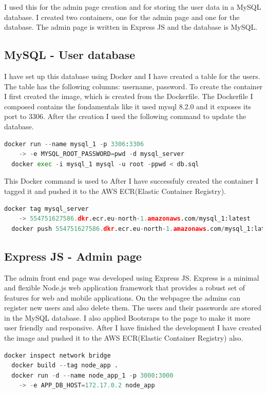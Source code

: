 \documentclass[11pt,a4paper,oneside]{report}
\begin{document}
I used this for the admin page creation and for storing the user data in a MySQL database. I created two containers, one for the admin page and one for the database. The admin page is written in Express JS and the database is MySQL.

\subsection{MySQL - User database}
I have set up this database using Docker and I have created a table for the users. The table has the following columns: username, password. To create the container I first created the image, which is created from the Dockerfile. The Dockerfile I composed contains the fondamentals like it used mysql 8.2.0 and it exposes its port to 3306.
After the creation I used the following command to update the database.
\begin{lstlisting}[language=Python,basicstyle=\ttfamily\small,]
  docker run --name mysql_1 -p 3306:3306 
    -> -e MYSQL_ROOT_PASSWORD=pwd -d mysql_server
  docker exec -i mysql_1 mysql -u root -ppwd < db.sql
\end{lstlisting}
This Docker command is used to
After I have successfuly created the container I tagged it and pushed it to the AWS ECR(Elastic Container Registry).

\begin{lstlisting}[language=Python,basicstyle=\ttfamily\small,]
  docker tag mysql_server 
    -> 554751627586.dkr.ecr.eu-north-1.amazonaws.com/mysql_1:latest
  docker push 554751627586.dkr.ecr.eu-north-1.amazonaws.com/mysql_1:latest
\end{lstlisting}

\subsection{Express JS - Admin page}

The admin front end page was developed using Express JS. Express is a minimal and flexible Node.js web application framework that provides a robust set of features for web and mobile applications.
On the webpagee the admins can register new users and also delete them. The users and their passwords are stored in the MySQL database. I also applied Bootsraps to the page to make it more user friendly and responsive.
After I have finished the development I have created the image and pushed it to the AWS ECR(Elastic Container Registry) also.
\begin{lstlisting}[language=Python,basicstyle=\ttfamily\small,]
  docker inspect network bridge
  docker build --tag node_app .   
  docker run -d --name node_app_1 -p 3000:3000 
    -> -e APP_DB_HOST=172.17.0.2 node_app
\end{lstlisting}
\end{document}
